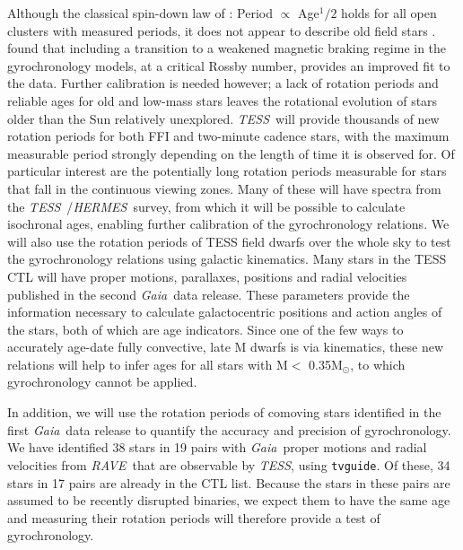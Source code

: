 \documentclass[letterpaper,12pt,preprint]{hack_aastex}
\newcommand{\Kepler}{{\it Kepler}}
\newcommand{\kepler}{\Kepler}
\newcommand{\TESS}{{\it TESS}}
\newcommand{\Gaia}{{\it Gaia}}
\newcommand{\RAVE}{{\it RAVE}}
\newcommand{\HERMES}{{\it HERMES}}
\begin{document}
Although the classical spin-down law of \citet{skumanich1972}: Period
$\propto$ Age$^1/2$ holds for all open clusters with measured periods, it does
not appear to describe old field stars \citep{angus2015, van-saders2016}.
\citet{van-saders2016} found that including a transition to a weakened magnetic
braking regime in the gyrochronology models, at a critical Rossby number,
provides an improved fit to the data.
Further calibration is needed however; a lack of rotation periods and reliable
ages for old and low-mass stars leaves the rotational evolution of stars older
than the Sun relatively unexplored.
\TESS\ will provide thousands of new rotation periods for both FFI and
two-minute cadence stars, with the maximum measurable period strongly
depending on the length of time it is observed for.
Of particular interest are the potentially long rotation periods measurable
for stars that fall in the continuous viewing zones.
Many of these will have spectra from the \TESS\ /\HERMES\ survey, from which it
will be possible to calculate isochronal ages, enabling further calibration of
the gyrochronology relations.
We will also use the rotation periods of TESS field dwarfs over the whole sky
to test the gyrochronology relations using galactic kinematics.
Many stars in the TESS CTL will have proper motions, parallaxes, positions and
radial velocities published in the second \Gaia\ data release.
These parameters provide the information necessary to calculate galactocentric
positions and action angles of the stars, both of which are age indicators.
Since one of the few ways to accurately age-date fully convective, late M
dwarfs is via kinematics, these new relations will help to infer ages for all
stars with M$<$ 0.35M$_\odot$, to which gyrochronology cannot be applied.

In addition, we will use the rotation periods of comoving stars identified in
the first \Gaia\ data release \citep{oh2016} to quantify the accuracy and
precision of gyrochronology.
We have identified 38 stars in 19 pairs with \Gaia\ proper motions and radial
velocities from \RAVE\ that are observable by \TESS, using {\tt tvguide}.
Of these, 34 stars in 17 pairs are already in the CTL list.
Because the stars in these pairs are assumed to be recently disrupted
binaries, we expect them to have the same age and measuring their rotation
periods will therefore provide a test of gyrochronology.
\end{document}
